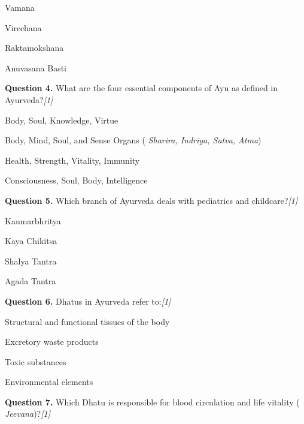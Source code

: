 \documentclass[11pt,a4paper]{article}
\newcommand{\pts}[1]{\hfill   \textit{[#1]}}
\begin{document}
\begin{parts}
  \item Vamana
  \item Virechana
  \item Raktamokshana
  \item Anuvasana Basti
\end{parts}

\medskip




\noindent   \textbf{Question 4.} What are the four essential components of Ayu as defined in Ayurveda?\pts{1}

\begin{parts}
  \item Body, Soul, Knowledge, Virtue
  \item Body, Mind, Soul, and Sense Organs (   \textit{Sharira, Indriya, Satva, Atma})
  \item Health, Strength, Vitality, Immunity
  \item Consciousness, Soul, Body, Intelligence
\end{parts}

\medskip




\noindent   \textbf{Question 5.} Which branch of Ayurveda deals with pediatrics and childcare?\pts{1}

\begin{parts}
  \item Kaumarbhritya
  \item Kaya Chikitsa
  \item Shalya Tantra
  \item Agada Tantra
\end{parts}

\medskip




\noindent   \textbf{Question 6.} Dhatus in Ayurveda refer to:\pts{1}

\begin{parts}
  \item Structural and functional tissues of the body
  \item Excretory waste products
  \item Toxic substances
  \item Environmental elements
\end{parts}

\medskip




\noindent   \textbf{Question 7.} Which Dhatu is responsible for blood circulation and life vitality (   \textit{Jeevana})?\pts{1}
\end{document}
